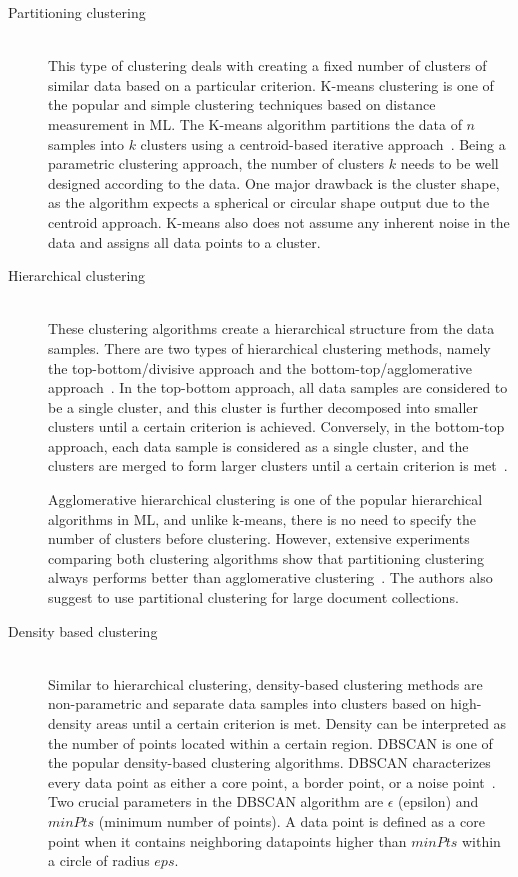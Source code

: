 \begin{description}
	
	\item [Partitioning clustering]  \hfill \\ 
	This type of clustering deals with creating a fixed number of clusters of similar data based on a particular criterion. K-means clustering is one of the popular and simple clustering techniques based on distance measurement in \ac{ML}. The K-means algorithm partitions the data of $n$ samples into $k$ clusters using a centroid-based iterative approach~\cite{afzali2019text}. Being a parametric clustering approach, the number of clusters $k$ needs to be well designed according to the data. One major drawback is the cluster shape, as the algorithm expects a spherical or circular shape output due to the centroid approach. K-means also does not assume any inherent noise in the data and assigns all data points to a cluster.
	
	
	\item [Hierarchical clustering]  \hfill \\ These clustering algorithms create a hierarchical structure from the data samples. There are two types of hierarchical clustering methods, namely the top-bottom/divisive approach and the bottom-top/agglomerative approach~\cite{afzali2019text}. In the top-bottom approach, all data samples are considered to be a single cluster, and this cluster is further decomposed into smaller clusters until a certain criterion is achieved. Conversely, in the bottom-top approach, each data sample is considered as a single cluster, and the clusters are merged to form larger clusters until a certain criterion is met~\cite{zhao2002comparison}.
	
	
	Agglomerative hierarchical clustering is one of the popular hierarchical algorithms in \ac{ML}, and unlike k-means, there is no need to specify the number of clusters before clustering. However, extensive experiments comparing both clustering algorithms show that partitioning clustering always performs better than agglomerative clustering~\cite{zhao2002comparison}. The authors also suggest to use partitional clustering for large document collections.

	
	\item [Density based clustering]  \hfill \\ Similar to hierarchical clustering, density-based clustering methods are non-parametric and separate data samples into clusters based on high-density areas until a certain criterion is met. Density can be interpreted as the number of points located within a certain region. \ac{DBSCAN} is one of the popular density-based clustering algorithms. \ac{DBSCAN} characterizes every data point as either a core point, a border point, or a noise point~\cite{campello2020density}. Two crucial parameters in the \ac{DBSCAN} algorithm are $\epsilon$ (epsilon) and $minPts$ (minimum number of points). A data point is defined as a core point when it contains neighboring datapoints higher than $minPts$ within a circle of radius $eps$.
	

\end{description}
